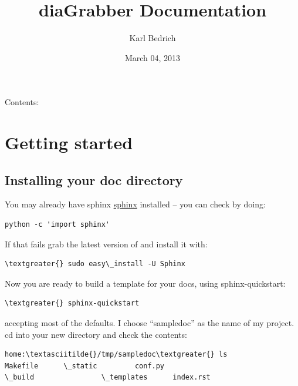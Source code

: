 \documentclass[letterpaper,10pt,english]{sphinxmanual}
\title{diaGrabber Documentation}
\date{March 04, 2013}
\author{Karl Bedrich}
\begin{document}
\maketitle
\tableofcontents
{}\label{index::doc}


Contents:


\chapter{Getting started}
\label{getting_started:welcome-to-diagrabber-s-documentation}\label{getting_started:getting-started}\label{getting_started::doc}\label{getting_started:id1}

\section{Installing your doc directory}
\label{getting_started:installing-your-doc-directory}\label{getting_started:installing-docdir}
You may already have sphinx \href{http://sphinx.pocoo.org/}{sphinx}
installed -- you can check by doing:

\begin{Verbatim}[commandchars=\\\{\}]
python -c 'import sphinx'
\end{Verbatim}

If that fails grab the latest version of and install it with:

\begin{Verbatim}[commandchars=\\\{\}]
\textgreater{} sudo easy\_install -U Sphinx
\end{Verbatim}

Now you are ready to build a template for your docs, using
sphinx-quickstart:

\begin{Verbatim}[commandchars=\\\{\}]
\textgreater{} sphinx-quickstart
\end{Verbatim}

accepting most of the defaults.  I choose ``sampledoc'' as the name of my
project.  cd into your new directory and check the contents:

\begin{Verbatim}[commandchars=\\\{\}]
home:\textasciitilde{}/tmp/sampledoc\textgreater{} ls
Makefile      \_static         conf.py
\_build                \_templates      index.rst
\end{Verbatim}
\end{document}
